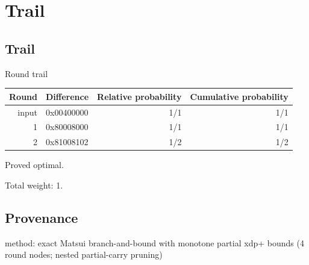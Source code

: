 \section*{Trail}

\subsection*{Trail}

Round trail

\begin{tabular}{rlrr}
\hline
Round & Difference & Relative probability & Cumulative probability \\
\hline
input & 0x00400000 & 1/1 & 1/1 \\
1 & 0x80008000 & 1/1 & 1/1 \\
2 & 0x81008102 & 1/2 & 1/2 \\
\hline
\end{tabular}

Proved optimal.

Total weight: 1.

\subsection*{Provenance}

method: exact Matsui branch-and-bound with monotone partial xdp+ bounds (4 round nodes; nested partial-carry pruning)
